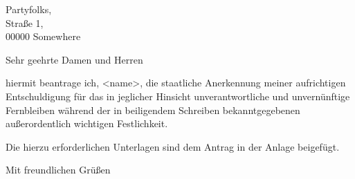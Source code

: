 \documentclass[
    sender,
    paper=a4,
    version=last,
    fontsize=11pt,
    DIV=13,
    BCOR=0mm]{scrlttr2}
\begin{document}
\begin{letter}{
    Partyfolks,\\
    Straße 1,\\
    00000 Somewhere
}
\opening{Sehr geehrte Damen und Herren}


hiermit beantrage ich, <name>, die staatliche Anerkennung meiner aufrichtigen Entschuldigung für das in jeglicher Hinsicht unverantwortliche und unvernünftige Fernbleiben während der in beiligendem Schreiben bekanntgegebenen außerordentlich wichtigen Festlichkeit.

Die hierzu erforderlichen Unterlagen sind dem Antrag in der Anlage beigefügt.


\closing{Mit freundlichen Grüßen} %

\end{letter}
\end{document}

